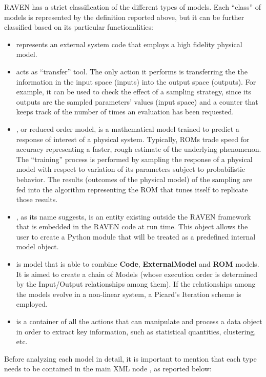 RAVEN has a strict classification of the different types of models.
%
Each ``class'' of models is represented by the definition reported above, but it
can be further classified based on its particular functionalities:
\begin{itemize}
  \item {} represents an external system code that employs a high
  fidelity physical model.
  \item {} acts as ``transfer'' tool.
  The only action it performs is transferring the the information in the input
  space (inputs) into the output space (outputs).
  For example, it can be used to check the effect of a sampling strategy, since
  its outputs are the sampled parameters' values (input space) and a counter
  that keeps track of the number of times an evaluation has been requested.
  \item {}, or reduced order model, is a mathematical model trained
  to predict a response of interest of a physical system.
  Typically, ROMs trade speed for accuracy representing a faster, rough estimate
  of the underlying phenomenon.
  The ``training'' process is performed by sampling the response of a physical
  model with respect to variation of its parameters subject to probabilistic
  behavior.
  The results (outcomes of the physical model) of the sampling are fed into
  the algorithm representing the ROM that tunes itself to replicate those
  results.
  \item {}, as its name suggests, is an entity existing
  outside the RAVEN framework that is embedded in the RAVEN code at run time.
  This object allows the user to create a Python module that will be treated as
  a predefined internal model object.
  \item {} is model that is able to combine \textbf{Code},
  \textbf{ExternalModel} and \textbf{ROM} models. It is aimed to create a chain
  of Models (whose execution order is determined by the Input/Output relationships among them).
  If the relationships among the models evolve in a non-linear system, a Picard's Iteration scheme
  is employed.
  \item {} is a container of all the actions that can
  manipulate and process a data object in order to extract key information,
  such as statistical quantities, clustering, etc.
\end{itemize}
Before analyzing each model in detail, it is important to mention that each
type needs to be contained in the main XML node , as reported
below:


